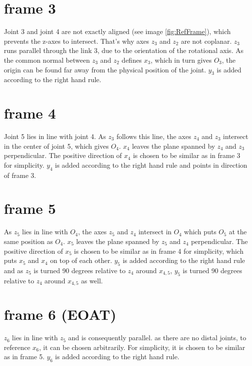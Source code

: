 \section{frame 3}
Joint 3 and joint 4 are not exactly aligned (see image \ref{fig:RefFrame}), which prevents the z-axes to intersect. That's why axes $z_3$ and $z_2$ are not coplanar. 
$z_3$ runs parallel through the link 3, due to the orientation of the rotational axis.
As the common normal between $z_3$ and $z_2$ defines $x_3$, which in turn gives $O_3$, the origin can be found far away from the physical position of the joint.
$y_3$ is added according to the right hand rule.

\section{frame 4}
Joint 5 lies in line with joint 4.
As $z_3$ follows this line, the axes  $z_4$ and $z_3$ intersect in the center of joint 5, which gives $O_4$. 
$x_4$ leaves the plane spanned by  $z_4$ and $z_3$ perpendicular.
The positive direction of $x_4$ is chosen to be similar as in frame 3 for simplicity.
$y_4$ is added according to the right hand rule and points in direction of frame 3.

\section{frame 5}
As $z_5$ lies  in line with $O_4$, the axes  $z_5$ and $z_4$ intersect in $O_4$ which puts $O_5$ at the same position as $O_4$.
$x_5$ leaves the plane spanned by  $z_5$ and $z_4$ perpendicular.
The positive direction of $x_5$ is chosen to be similar as in frame 4 for simplicity, which puts $x_5$ and $x_4$ on top of each other. 
$y_5$ is added according to the right hand rule and as $z_5$ is turned 90 degrees relative to $z_4$ around $x_{4,5}$, $y_5$ is turned 90 degrees relative to $z_4$ around $x_{4,5}$ as well.

\section{frame 6 (EOAT)}
$z_6$ lies in line with $z_5$ and is consequently parallel.
as there are no distal joints, to reference $x_6$, it can be chosen arbitrarily. 
For simplicity, it is chosen to be similar as in frame 5. 
$y_6$ is added according to the right hand rule.\\
\\

